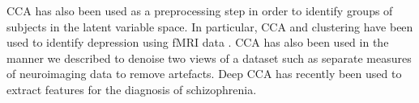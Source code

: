 CCA has also been used as a preprocessing step in order to identify groups of subjects in the latent variable space.
In particular, CCA and clustering have been used to identify depression using fMRI data\citep{dinga2019evaluating} \citep{drysdale2017resting}.
CCA has also been used in the manner we described to denoise two views of a dataset such as separate measures of neuroimaging data \citep{zhuang2020technical} to remove artefacts.
Deep CCA has recently been used to extract features for the diagnosis of schizophrenia\citep{qi2016deep}.





